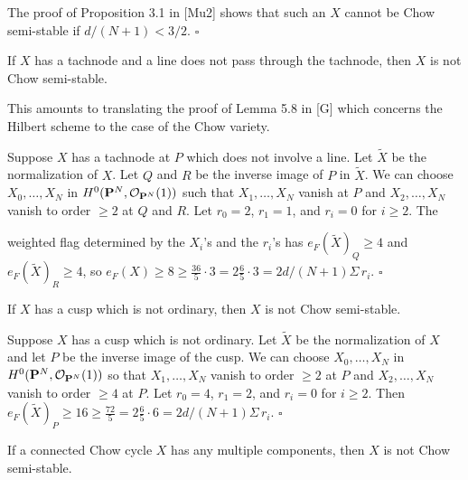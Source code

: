 \documentclass[12pt]{memoir}
\begin{document}
\begin{ptcbp}
The proof of Proposition 3.1 in [Mu2] shows that such an $X$ cannot be Chow semi-stable if $d/(N+1) < 3/2$. \hfill$\square$
\end{ptcbp}

\begin{Lem}\label{lem:2.2}
If $X$ has a tachnode and a line does not pass through the tachnode, then $X$ is not Chow semi-stable.
\end{Lem}

\begin{ptcbp}
This amounts to translating the proof of Lemma 5.8 in [G] which concerns the Hilbert scheme to the case of the Chow variety.

Suppose $X$ has a tachnode at $P$ which does not involve a line. Let $\tilde{X}$ be the normalization of $X$. Let $Q$ and $R$ be the inverse image of $P$ in $\tilde{X}$. We can choose $X_0, \dots, X_N$ in $H^0(\mathbf{P}^N, \mathcal{O}_{\mathbf{P}^N}(1))$ such that $X_1, \dots, X_N$ vanish at $P$ and $X_2, \dots, X_N$ vanish to order $\geqslant 2$ at $Q$ and $R$. Let $r_0 = 2$, $r_1 = 1$, and $r_i = 0$ for $i \geqslant 2$. The


weighted flag determined by the $X_i$'s and the $r_i$'s has $e_F(\tilde{X})_Q \geqslant 4$ and $e_F(\tilde{X})_R \geqslant 4$, so $e_F(X) \geqslant 8 \geqslant \frac{36}{5} \cdot 3 = 2\frac{6}{5} \cdot 3 = 2d/(N+1) \Sigma\, r_i$. \hfill$\square$
\end{ptcbp}

\begin{Lem}\label{lem:2.3}
If $X$ has a cusp which is not ordinary, then $X$ is not Chow semi-stable.
\end{Lem}

\begin{ptcbp}
Suppose $X$ has a cusp which is not ordinary. Let $\tilde{X}$ be the normalization of $X$ and let $P$ be the inverse image of the cusp. We can choose $X_0, \dots, X_N$ in $H^0(\mathbf{P}^N, \mathcal{O}_{\mathbf{P}^N}(1))$ so that $X_1, \dots, X_N$ vanish to order $\geqslant 2$ at $P$ and $X_2, \dots, X_N$ vanish to order $\geqslant 4$ at $P$. Let $r_0 = 4$, $r_1 = 2$, and $r_i = 0$ for $i \geqslant 2$. Then $e_F(\tilde{X})_P \geqslant 16 \geqslant \frac{72}{5} = 2\frac{6}{5} \cdot 6 = 2d/(N+1) \Sigma\, r_i$. \hfill$\square$
\end{ptcbp}

\begin{Lem}\label{lem:2.4}
If a connected Chow cycle $X$ has any multiple components, then $X$ is not Chow semi-stable.
\end{Lem}
\end{document}
